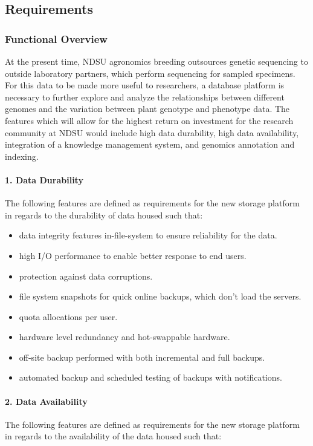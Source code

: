 \documentclass[12pt, letterpaper,oneocolumn]{article}
\begin{document}
	\subsection{Requirements}

	\subsubsection{Functional Overview}
At the present time, NDSU agronomics breeding outsources genetic
sequencing to outside laboratory partners, which perform sequencing for
sampled specimens. For this data to be made more useful to researchers,
a database platform is necessary to further explore and analyze the
relationships between different genomes and the variation between plant
genotype and phenotype data. The features which will allow for the
highest return on investment for the research community at NDSU would
include high data durability, high data availability, integration of a
knowledge management system, and genomics annotation and indexing.

\paragraph{1. Data Durability} The following features are defined as requirements for the new storage platform in regards to the durability of data housed such that:

\begin{itemize}
\item
  data integrity features in-file-system to ensure reliability for the
  data.
\item
  high I/O performance to enable better response to end users.
\item
  protection against data corruptions.
\item
  file system snapshots for quick online backups, which don't load the
  servers.
\item
  quota allocations per user.
\item
  hardware level redundancy and hot-swappable hardware.
\item
  off-site backup performed with both incremental and full backups.
\item
  automated backup and scheduled testing of backups with notifications.
\end{itemize}

\paragraph{2. Data Availability}
The following features are defined as requirements for the new storage
platform in regards to the availability of the data housed such that:
\end{document}
